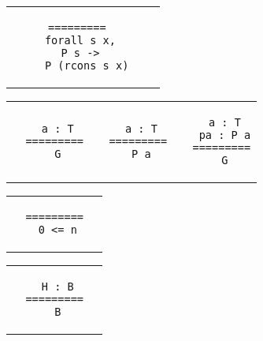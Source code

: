 \begin{landscape}
\begin{small}
\begin{multicols*}{3}[\begin{center}\section*{}\end{center}]
\begin{tabular}{c@{$\to$}cc}
  \begin{minipage}{0.12\textwidth}\begin{lstlisting}
  =========
   forall s x,
    P s -> 
     P (rcons s x)
  \end{lstlisting}\end{minipage}
  \end{tabular}
  \begin{tabular}{c@{$\to$}cc} 
  \begin{minipage}{0.10\textwidth}\begin{lstlisting}
   a : T
  =========
   G
  \end{lstlisting}\end{minipage}
  &
  \begin{minipage}{0.10\textwidth}\begin{lstlisting}
   a : T
  =========
   P a
  \end{lstlisting}\end{minipage}
  &
  \begin{minipage}{0.10\textwidth}\begin{lstlisting}
   a : T
   pa : P a
  =========
   G
  \end{lstlisting}\end{minipage}
  \end{tabular}
  \begin{tabular}{c@{$\to$}c} 
  \begin{minipage}{0.15\textwidth}\begin{lstlisting}
  =========
   0 <= n
  \end{lstlisting}\end{minipage}
  &
  \begin{minipage}{0.15\textwidth}\begin{lstlisting}
  \end{lstlisting}\end{minipage}
  \end{tabular}
  \begin{tabular}{c@{$\to$}c} 
  \begin{minipage}{0.15\textwidth}\begin{lstlisting}
   H : B
  =========
   B
  \end{lstlisting}\end{minipage}
  &
  \begin{minipage}{0.15\textwidth}\begin{lstlisting}
  \end{lstlisting}\end{minipage}
  \end{tabular}


\end{multicols*}
\end{small}
\end{landscape}
